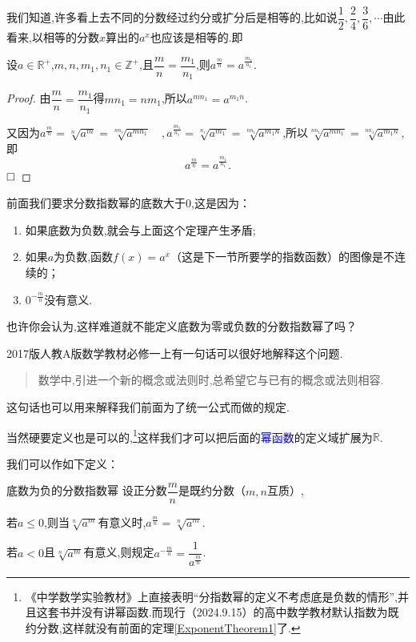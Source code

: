 \documentclass[lang=cn,math=cm,chinesefont=nofont,11pt,scheme=chinese,twocol]{elegantbook}
\begin{document}
我们知道,许多看上去不同的分数经过约分或扩分后是相等的,比如说$\dfrac12,\dfrac24,\dfrac36,\cdots$由此看来,以相等的分数$x$算出的$a^x$也应该是相等的.即

\begin{theorem}\label{ExponentTheorem1}
  设$a\in\mathbb{R}^+$,$m,n,m_1,n_1\in\mathbb{Z}^+$,且$\dfrac mn=\dfrac{m_1}{n_1}$,则$a^{\frac mn}=a^\frac{m_1}{n_1}$.
\end{theorem}

\begin{proof}
  由$\dfrac mn=\dfrac{m_1}{n_1}$得$mn_1=nm_1$,所以$a^{mn_1}=a^{m_1n}$.

  又因为$a^{\frac mn}=\sqrt[n]{a^m}=\sqrt[nn_1]{a^{mn_1}}\quad ,a^{\frac{m_1}{n_1}}=\sqrt[n_1]{a^{m_1}}=\sqrt[nn_1]{a^{m_1n}}$,所以$\sqrt[nn_1]{a^{mn_1}}=\sqrt[nn_1]{a^{m_1n}}$,即$$a^{\frac mn}=a^{\frac{m_1}{n_1}}.$$ $\hfill\square$
\end{proof}

前面我们要求分数指数幂的底数大于$0$,这是因为：

\begin{enumerate}
  \item 如果底数为负数,就会与上面这个定理产生矛盾;
  \item 如果$a$为负数,函数$f(x)=a^x$（这是下一节所要学的指数函数）的图像是不连续的；
  \item $0^{-\frac{m}{n}}$没有意义.
\end{enumerate}

也许你会认为,这样难道就不能定义底数为零或负数的分数指数幂了吗？

2017版人教A版数学教材必修一上有一句话可以很好地解释这个问题.

\begin{quotation}
  数学中,引进一个新的概念或法则时,总希望它与已有的概念或法则相容.
\end{quotation}

这句话也可以用来解释我们前面为了统一公式而做的规定.

当然硬要定义也是可以的,\footnote{《中学数学实验教材》上直接表明“分指数幂的定义不考虑底是负数的情形”,并且这套书并没有讲幂函数.而现行（2024.9.15）的高中数学教材默认指数为既约分数,这样就没有前面的定理\ref{ExponentTheorem1}了.}这样我们才可以把后面的\textcolor{blue}{幂函数}的定义域扩展为$\mathbb{R}$.

我们可以作如下定义：

\begin{definition}{底数为负的分数指数幂}
  设正分数$\dfrac{m}{n}$是既约分数（$m,n$互质）,
  
  若$a\leqslant 0$,则当$\sqrt[n]{a^m}$有意义时,$a^{\frac{m}{n}}=\sqrt[n]{a^m}$.

  若$a<0$且$\sqrt[n]{a^m}$有意义,则规定$a^{-\frac{m}{n}}=\dfrac{1}{a^\frac{m}{n}}$.
\end{definition}
\end{document}
